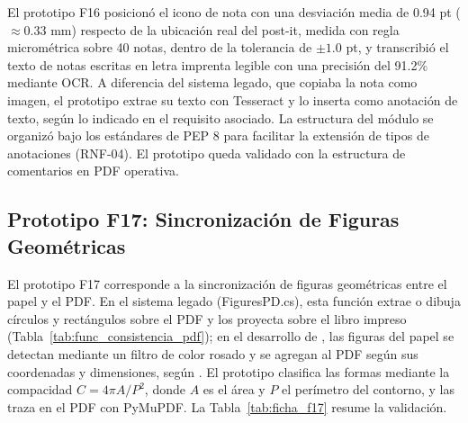 El prototipo F16 posicionó el icono de nota con una desviación media de 0.94 pt ($\approx 0.33$ mm) respecto de la ubicación real del post-it, medida con regla micrométrica sobre 40 notas, dentro de la tolerancia de $\pm 1.0$ pt, y transcribió el texto de notas escritas en letra imprenta legible con una precisión del 91.2\% mediante OCR. A diferencia del sistema legado, que copiaba la nota como imagen, el prototipo extrae su texto con Tesseract y lo inserta como anotación de texto, según lo indicado en el requisito asociado. La estructura del módulo se organizó bajo los estándares de PEP 8 para facilitar la extensión de tipos de anotaciones (RNF-04). El prototipo queda validado con la estructura de comentarios en PDF operativa.
 
\subsection{Prototipo F17: Sincronización de Figuras Geométricas}
 
El prototipo F17 corresponde a la sincronización de figuras geométricas entre el papel y el PDF. En el sistema legado (FiguresPD.cs), esta función extrae o dibuja círculos y rectángulos sobre el PDF y los proyecta sobre el libro impreso (Tabla~\ref{tab:func_consistencia_pdf}); en el desarrollo de \cite{pezoa2020implementacion}, las figuras del papel se detectan mediante un filtro de color rosado y se agregan al PDF según sus coordenadas y dimensiones, según \cite{ibaceta2023evaluacion}. El prototipo clasifica las formas mediante la compacidad $C = 4\pi A / P^{2}$, donde $A$ es el área y $P$ el perímetro del contorno, y las traza en el PDF con PyMuPDF. La Tabla~\ref{tab:ficha_f17} resume la validación.
 
